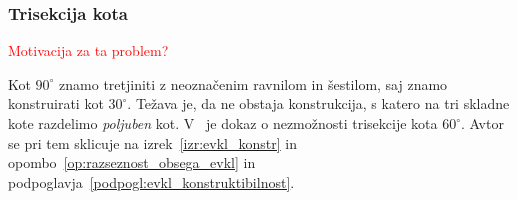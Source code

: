 


\subsubsection{Trisekcija kota}

\textcolor{red}{Motivacija za ta problem?}

Kot $90^\circ$ znamo tretjiniti z neoznačenim ravnilom in šestilom, saj znamo konstruirati kot $30^\circ$. Težava je, da ne obstaja konstrukcija, s katero na tri skladne kote razdelimo \emph{poljuben} kot. V~\cite[str.\ 77--78]{jerman1998} je dokaz o nezmožnosti trisekcije kota $60^\circ$. Avtor se pri tem sklicuje na izrek~\ref{izr:evkl_konstr} in opombo~\ref{op:razseznost_obsega_evkl} in podpoglavja~\ref{podpogl:evkl_konstruktibilnost}.





